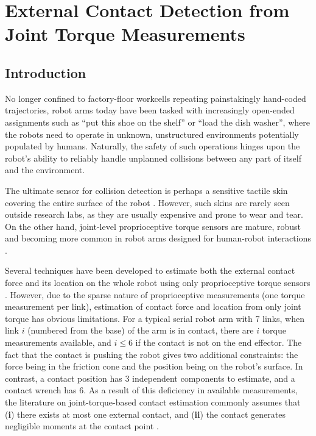 \chapter{External Contact Detection from Joint Torque Measurements} \label{chapter:force_from_torque}
\section{Introduction}
No longer confined to factory-floor workcells repeating painstakingly hand-coded trajectories, robot arms today have been tasked with increasingly open-ended assignments such as ``put this shoe on the shelf'' or ``load the dish washer'', where the robots need to operate in unknown, unstructured environments potentially populated by humans. Naturally, the safety of such operations hinges upon the robot's ability to reliably handle unplanned collisions between any part of itself and the environment. 

The ultimate sensor for collision detection is perhaps a sensitive tactile skin covering the entire surface of the robot \cite{cannata2008embedded, jain2013reaching}. However, such skins are rarely seen outside research labs, as they are usually expensive and prone to wear and tear. On the other hand, joint-level proprioceptive torque sensors are mature, robust and becoming more common in robot arms designed for human-robot interactions \cite{loughlin2007dlr, franka}.

Several techniques have been developed to estimate both the external contact force and its location on the whole robot using only proprioceptive torque sensors \cite{haddadin2017robot, manuelli2016localizing, zwiener2018contact, zwiener2019armcl}. However, due to the sparse nature of proprioceptive measurements (one torque measurement per link), estimation of contact force and location from only joint torque has obvious limitations. For a typical serial robot arm with 7 links, when link $i$ (numbered from the base) of the arm is in contact, there are $i$ torque measurements available, and $i \leq 6$ if the contact is not on the end effector. The fact that the contact is pushing the robot gives two additional constraints: the force being in the friction cone and the position being on the robot's surface. In contrast, a contact position has 3 independent components to estimate, and a contact wrench has 6. As a result of this deficiency in available measurements, the literature on joint-torque-based contact estimation commonly assumes that (\textbf{i}) there exists at most one external contact, and (\textbf{ii}) the contact generates negligible moments at the contact point \cite{haddadin2017robot, zwiener2019armcl}.

